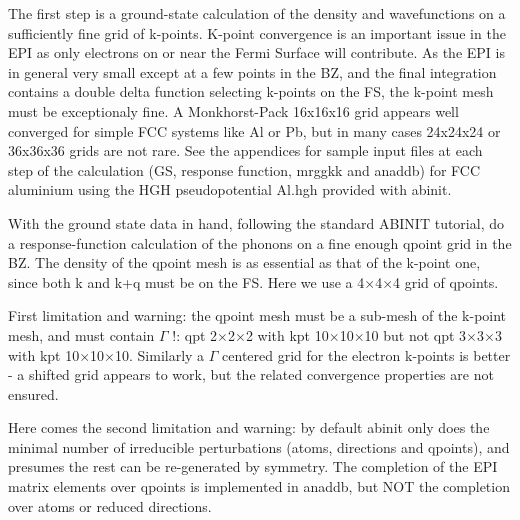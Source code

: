 \documentclass[aps,preprint]{revtex4-1}
\begin{document}
The first step is a ground-state calculation of the density and wavefunctions
on a sufficiently fine grid of k-points. K-point convergence is an important
issue in the EPI as only electrons on or near the Fermi Surface will
contribute. As the EPI is in general very small except at a few points in the
BZ, and the final integration contains a double delta function selecting
k-points on the FS, the k-point mesh must be exceptionaly fine. A Monkhorst-Pack
16x16x16 grid appears well converged for simple FCC systems like Al or Pb, but
in many cases 24x24x24 or 36x36x36 grids are not rare. See
the appendices for sample input files at each step of the calculation (GS,
response function, mrggkk and anaddb) for FCC aluminium using the HGH
pseudopotential Al.hgh provided with abinit.

With the ground state data in hand, following the standard ABINIT tutorial, do
a response-function calculation of the phonons on a fine enough qpoint grid in
the BZ. The density of the qpoint mesh is as essential as that of the
k-point one, since both k and k+q must be on the FS.
Here we use a 4$\times$4$\times$4 grid of qpoints.

First limitation and warning: the qpoint mesh must be a sub-mesh of the k-point
mesh, and must contain $\Gamma$ !: qpt 2$\times$2$\times$2 with kpt
10$\times$10$\times$10 but not qpt 3$\times$3$\times$3 with kpt
10$\times$10$\times$10. Similarly a $\Gamma$ centered grid for the electron
k-points is better - a shifted grid appears to work, but the related
convergence properties are not ensured.

Here comes the second limitation and warning: by default abinit only does the
minimal number of irreducible perturbations (atoms, directions and qpoints),
and presumes the rest can be re-generated by symmetry. The
completion of the EPI matrix elements over qpoints is implemented in anaddb,
but NOT the completion over atoms or reduced directions.
\end{document}
